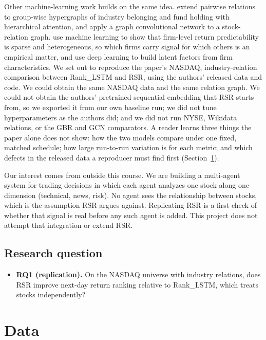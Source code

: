 \documentclass[12pt]{article}
\begin{document}
Other machine-learning work builds on the same idea. \citet{cui2023temporal} extend pairwise
relations to group-wise hypergraphs of industry belonging and fund holding with hierarchical
attention, and \citet{jafari2022gcnet} apply a graph convolutional network to a stock-relation
graph. \citet{evgeniou2023uncovering} use machine learning to show that firm-level return
predictability is sparse and heterogeneous, so which firms carry signal for which others is an
empirical matter, and \citet{feng2024deep} use deep learning to build latent factors from firm
characteristics.
We set out to reproduce the paper's NASDAQ, industry-relation comparison between Rank\_LSTM and
RSR, using the authors' released data and code. We could obtain the same NASDAQ data and the
same relation graph. We could not obtain the authors' pretrained sequential embedding that RSR
starts from, so we exported it from our own baseline run; we did not tune hyperparameters as the
authors did; and we did not run NYSE, Wikidata relations, or the GBR and GCN comparators. A
reader learns three things the paper alone does not show: how the two models compare under one
fixed, matched schedule; how large run-to-run variation is for each metric; and which defects in
the released data a reproducer must find first (Section~\ref{sec:data}).

Our interest comes from outside this course. We are building a multi-agent system for trading
decisions in which each agent analyzes one stock along one dimension (technical, news, risk).
No agent sees the relationship between stocks, which is the assumption RSR argues against.
Replicating RSR is a first check of whether that signal is real before any such agent is added.
This project does not attempt that integration or extend RSR.

\subsection{Research question}

\begin{itemize}
  \item \textbf{RQ1 (replication).} On the NASDAQ universe with industry relations, does RSR
  improve next-day return ranking relative to Rank\_LSTM, which treats stocks independently?
\end{itemize}


\section{Data}
\label{sec:data}
\end{document}
